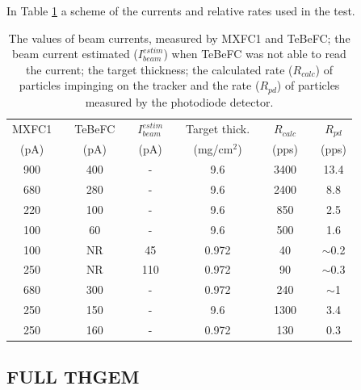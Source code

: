 \documentclass[a4paper, 11 pt]{report}
\begin{document}
In Table \ref{tab:current_rate} a scheme of the currents and relative rates used in the test.

\begin{table} [!h]
	\begin{center}
		\renewcommand{\arraystretch}{1.2}
		\begin{tabular} {ccccccccccc}
			MXFC1   & & TeBeFC  & & $I_{beam}^{estim}$ & & Target thick.	& & $R_{calc}$ & & $R_{pd}$ \\
			(pA)  	& &   (pA)  & &       (pA)		   & &  (mg/$\mbox{cm}^2$)&&  (pps)   & &   (pps)   \\
			\toprule[0.1em]
			900	& & 400	& &	-		& & 9.6		& & 3400	& & 13.4		\\
			680	& &	280	& & -		& & 9.6		& &	2400	& & 8.8			\\
			220	& & 100	& & - 		& & 9.6		& & 850		& & 2.5			\\
			100	& & 60	& & - 		& & 9.6		& & 500 	& & 1.6			\\
			100	& & NR	& & 45 		& & 0.972	& & 40  	& & $\sim$0.2	\\
			250	& & NR	& & 110		& & 0.972	& & 90  	& & $\sim$0.3	\\
			680	& &	300	& & -		& & 0.972	& &	240		& & $\sim$1		\\
			250	& & 150	& & - 		& & 9.6		& & 1300	& & 3.4			\\
			250	& & 160	& & - 		& & 0.972	& & 130 	& & 0.3			\\
			\bottomrule[0.1em]
		\end{tabular}
	\end{center}
	\caption{The values of beam currents, measured by MXFC1 and TeBeFC; the beam current estimated ($I_{beam}^{estim}$) when TeBeFC was not able to read the current; the target thickness; the calculated rate ($R_{calc}$) of particles impinging on the tracker and the rate ($R_{pd}$) of particles measured by the photodiode detector.} \label{tab:current_rate}
\end{table}


\clearpage
\subsection{FULL THGEM}
\end{document}
